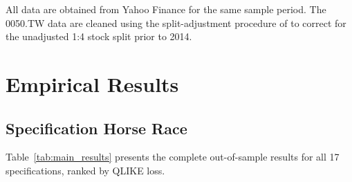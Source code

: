 \documentclass[12pt,a4paper]{article}
\begin{document}
All data are obtained from Yahoo Finance for the same sample period. The 0050.TW data are cleaned using the split-adjustment procedure of \citet{lai2026vt} to correct for the unadjusted 1:4 stock split prior to 2014.


\section{Empirical Results}
\label{sec:results}

\subsection{Specification Horse Race}
\label{sec:horse_race}

Table~\ref{tab:main_results} presents the complete out-of-sample results for all 17 specifications, ranked by QLIKE loss.
\end{document}
